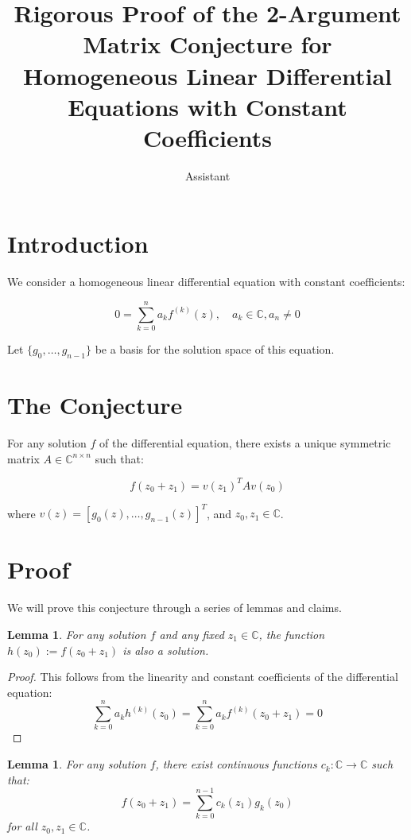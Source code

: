 \documentclass{article}
\title{Rigorous Proof of the 2-Argument Matrix Conjecture for Homogeneous Linear Differential Equations with Constant Coefficients}
\author{Assistant}
\newtheorem{lemma}[theorem]{Lemma}
\begin{document}
\maketitle

\section{Introduction}

We consider a homogeneous linear differential equation with constant coefficients:

\[
0 = \sum_{k=0}^n a_k f^{(k)}(z), \quad a_k \in \mathbb{C}, a_n \neq 0
\]

Let $\{g_0, \ldots, g_{n-1}\}$ be a basis for the solution space of this equation.

\section{The Conjecture}

For any solution $f$ of the differential equation, there exists a unique symmetric matrix $A \in \mathbb{C}^{n \times n}$ such that:

\[
f(z_0 + z_1) = v(z_1)^T A v(z_0)
\]

where $v(z) = [g_0(z), \ldots, g_{n-1}(z)]^T$, and $z_0, z_1 \in \mathbb{C}$.

\section{Proof}

We will prove this conjecture through a series of lemmas and claims.

\begin{lemma}
For any solution $f$ and any fixed $z_1 \in \mathbb{C}$, the function $h(z_0) := f(z_0 + z_1)$ is also a solution.
\end{lemma}

\begin{proof}
This follows from the linearity and constant coefficients of the differential equation:
\[
\sum_{k=0}^n a_k h^{(k)}(z_0) = \sum_{k=0}^n a_k f^{(k)}(z_0 + z_1) = 0
\]
\end{proof}

\begin{lemma}
For any solution $f$, there exist continuous functions $c_k: \mathbb{C} \to \mathbb{C}$ such that:
\[
f(z_0 + z_1) = \sum_{k=0}^{n-1} c_k(z_1) g_k(z_0)
\]
for all $z_0, z_1 \in \mathbb{C}$.
\end{lemma}
\end{document}
